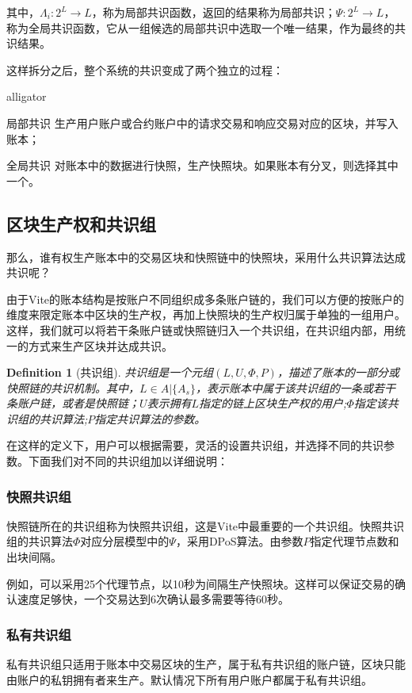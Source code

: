 \documentclass[UTF8,nofonts]{ctexart}
\newtheorem{definition}{Definition}[section]
\begin{document}
\begin{multicols}{2}
其中，$\Lambda_i: 2^L \rightarrow L$，称为局部共识函数，返回的结果称为局部共识；$\Psi: 2^L \rightarrow L$，称为全局共识函数，它从一组候选的局部共识中选取一个唯一结果，作为最终的共识结果。

这样拆分之后，整个系统的共识变成了两个独立的过程：
\begin{labeling}{alligator}
\item [局部共识] 生产用户账户或合约账户中的请求交易和响应交易对应的区块，并写入账本；
\item [全局共识] 对账本中的数据进行快照，生产快照块。如果账本有分叉，则选择其中一个。
\end{labeling}

\subsection{区块生产权和共识组}
那么，谁有权生产账本中的交易区块和快照链中的快照块，采用什么共识算法达成共识呢？

由于Vite的账本结构是按账户不同组织成多条账户链的，我们可以方便的按账户的维度来限定账本中区块的生产权，再加上快照块的生产权归属于单独的一组用户。这样，我们就可以将若干条账户链或快照链归入一个共识组，在共识组内部，用统一的方式来生产区块并达成共识。

\begin{definition}[共识组]
共识组是一个元组$(L, U, \Phi, P)$，描述了账本的一部分或快照链的共识机制。其中，$L \in A \vert \{ A_s \}$，表示账本中属于该共识组的一条或若干条账户链，或者是快照链；$U$表示拥有$L$指定的链上区块生产权的用户;$\Phi$指定该共识组的共识算法;$P$指定共识算法的参数。
\end{definition}

在这样的定义下，用户可以根据需要，灵活的设置共识组，并选择不同的共识参数。下面我们对不同的共识组加以详细说明：

\subsubsection{快照共识组}
快照链所在的共识组称为快照共识组，这是Vite中最重要的一个共识组。快照共识组的共识算法$\Phi$对应分层模型中的$\Psi$，采用DPoS算法。由参数$P$指定代理节点数和出块间隔。

例如，可以采用25个代理节点，以10秒为间隔生产快照块。这样可以保证交易的确认速度足够快，一个交易达到6次确认最多需要等待60秒。

\subsubsection{私有共识组}
私有共识组只适用于账本中交易区块的生产，属于私有共识组的账户链，区块只能由账户的私钥拥有者来生产。默认情况下所有用户账户都属于私有共识组。


\end{multicols}
\end{document}
